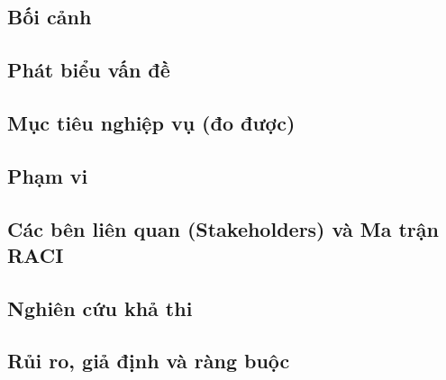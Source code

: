 


\subsection{Bối cảnh}

\subsection{Phát biểu vấn đề}

\subsection{Mục tiêu nghiệp vụ (đo được)}

\subsection{Phạm vi}

\subsection{Các bên liên quan (Stakeholders) và Ma trận RACI}

\subsection{Nghiên cứu khả thi}

\subsection{Rủi ro, giả định và ràng buộc}
